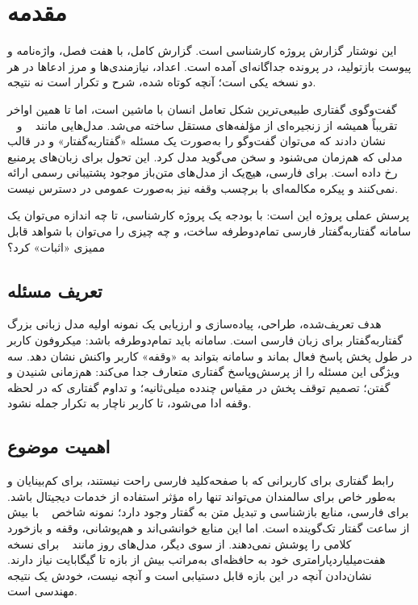 \chapter{مقدمه}
\label{ch:intro}

این نوشتار  گزارش پروژه کارشناسی است. گزارش کامل، با هفت
فصل، واژه‌نامه و پیوست بازتولید، در پرونده جداگانه‌ای آمده است. اعداد،
نیازمندی‌ها و مرز ادعاها در هر دو نسخه یکی است؛ آنچه کوتاه شده، شرح و
تکرار است نه نتیجه.

گفت‌وگوی گفتاری طبیعی‌ترین شکل تعامل انسان با ماشین است، اما تا همین اواخر
تقریباً همیشه از زنجیره‌ای از مؤلفه‌های مستقل ساخته می‌شد. مدل‌هایی مانند
~\cite{defossez2024moshi} و
~\cite{wang2025freezeomni} نشان دادند که می‌توان گفت‌وگو را
به‌صورت یک مسئله «گفتار‌به‌گفتار» و در قالب مدلی که هم‌زمان می‌شنود و سخن
می‌گوید مدل کرد. این تحول برای زبان‌های پرمنبع رخ داده است. برای فارسی،
هیچ‌یک از مدل‌های متن‌باز موجود پشتیبانی رسمی ارائه نمی‌کنند و پیکره
مکالمه‌ای با برچسب وقفه نیز به‌صورت عمومی در دسترس نیست.

پرسش عملی پروژه این است: با بودجه یک پروژه کارشناسی، تا چه اندازه می‌توان
یک سامانه گفتار‌به‌گفتار فارسی تمام‌دوطرفه ساخت، و چه چیزی را می‌توان با
شواهد قابل ممیزی «اثبات» کرد؟

\section{تعریف مسئله}
\label{sec:problem}

هدف تعریف‌شده، طراحی، پیاده‌سازی و ارزیابی یک نمونه اولیه مدل زبانی بزرگ
گفتار‌به‌گفتار برای زبان فارسی است. سامانه باید تمام‌دوطرفه باشد: میکروفون
کاربر در طول پخش پاسخ فعال بماند و سامانه بتواند به «وقفه» کاربر واکنش
نشان دهد. سه ویژگی این مسئله را از پرسش‌و‌پاسخ گفتاری متعارف جدا می‌کند:
هم‌زمانی شنیدن و گفتن؛ تصمیم توقف پخش در مقیاس چند‌ده میلی‌ثانیه؛ و
تداوم گفتاری که در لحظه وقفه ادا می‌شود، تا کاربر ناچار به تکرار جمله
نشود.

\section{اهمیت موضوع}

رابط گفتاری برای کاربرانی که با صفحه‌کلید فارسی راحت نیستند، برای
کم‌بینایان و به‌طور خاص برای سالمندان می‌تواند تنها راه مؤثر استفاده از
خدمات دیجیتال باشد. برای فارسی، منابع بازشناسی و تبدیل متن به گفتار وجود
دارد؛ نمونه شاخص ~\cite{qharabagh2025manatts} با بیش از
 ساعت گفتار تک‌گوینده است. اما این منابع خوانشی‌اند و هم‌پوشانی،
وقفه و بازخورد کلامی را پوشش نمی‌دهند. از سوی دیگر، مدل‌های روز مانند
~\cite{xu2025qwen25omni} برای نسخه هفت‌میلیارد‌پارامتری
خود به حافظه‌ای به‌مراتب بیش از بازه  تا  گیگابایت نیاز دارند.
نشان‌دادن آنچه در این بازه قابل دستیابی است و آنچه نیست، خودش یک نتیجه
مهندسی است.

